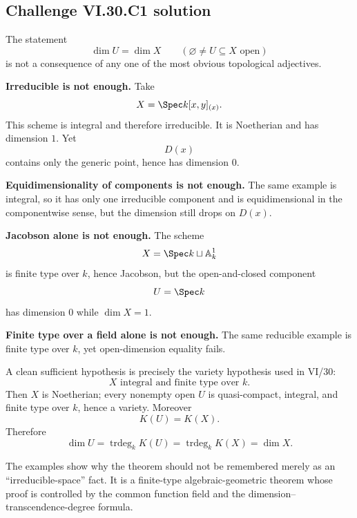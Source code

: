 
\subsection*{Challenge VI.30.C1 solution}
\begin{solution}
The statement
\[
\dim U=\dim X
\qquad
(\varnothing\ne U\subseteq X\text{ open})
\]
is not a consequence of any one of the most obvious topological adjectives.

\textbf{Irreducible is not enough.}
Take
\[
X=\Spec k[x,y]_{(x)}.
\]
This scheme is integral and therefore irreducible. It is Noetherian and has dimension \(1\). Yet
\[
D(x)
\]
contains only the generic point, hence has dimension \(0\).

\textbf{Equidimensionality of components is not enough.}
The same example is integral, so it has only one irreducible component and is equidimensional in the
componentwise sense, but the dimension still drops on \(D(x)\).

\textbf{Jacobson alone is not enough.}
The scheme
\[
X=\Spec k\sqcup\mathbb A^1_k
\]
is finite type over \(k\), hence Jacobson, but the open-and-closed component
\[
U=\Spec k
\]
has dimension \(0\) while \(\dim X=1\).

\textbf{Finite type over a field alone is not enough.}
The same reducible example is finite type over \(k\), yet open-dimension equality fails.

A clean sufficient hypothesis is precisely the variety hypothesis used in VI/30:
\[
X\text{ integral and finite type over }k.
\]
Then \(X\) is Noetherian; every nonempty open \(U\) is quasi-compact, integral, and finite type over \(k\), hence a
variety. Moreover
\[
K(U)=K(X).
\]
Therefore
\[
\dim U
=
\operatorname{trdeg}_kK(U)
=
\operatorname{trdeg}_kK(X)
=
\dim X.
\]

The examples show why the theorem should not be remembered merely as an ``irreducible-space'' fact. It is a
finite-type algebraic-geometric theorem whose proof is controlled by the common function field and the
dimension--transcendence-degree formula.
\end{solution}


